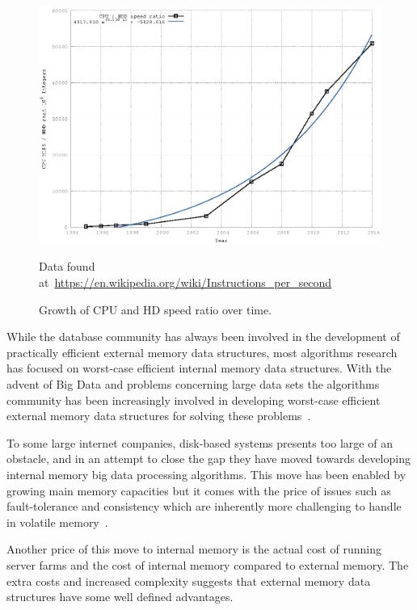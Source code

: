 \documentclass[twoside,11pt,openright]{report}
\begin{document}
\begin{figure}[h]
	\centering
		\includegraphics[width=\textwidth]{../plots/scaling_discrepancy_hdd_cpu/scaling_discrepancy_hdd_cpu}
	\caption{Growth of CPU and HD speed ratio over time.}
	\tiny{Data found at~\protect\url{https://en.wikipedia.org/wiki/Instructions_per_second}}
	\label{fig:cpu_vs_disk}
\end{figure}

While the database community has always been involved in the development of practically efficient external memory data structures, most algorithms research has focused on worst-case efficient internal memory data structures. With the advent of Big Data and problems concerning large data sets the algorithms community has been increasingly involved in developing worst-case efficient external memory data structures for solving these problems~\cite{ionote}.

To some large internet companies, disk-based systems presents too large of an obstacle, and in an attempt to close the gap they have moved towards developing internal memory big data processing algorithms. This move has been enabled by growing main memory capacities but it comes with the price of issues such as fault-tolerance and consistency which are inherently more challenging to handle in volatile memory~\cite{Zhang2015}.

Another price of this move to internal memory is the actual cost of running server farms and the cost of internal memory compared to external memory. The extra costs and increased complexity suggests that external memory data structures have some well defined advantages.
\end{document}
